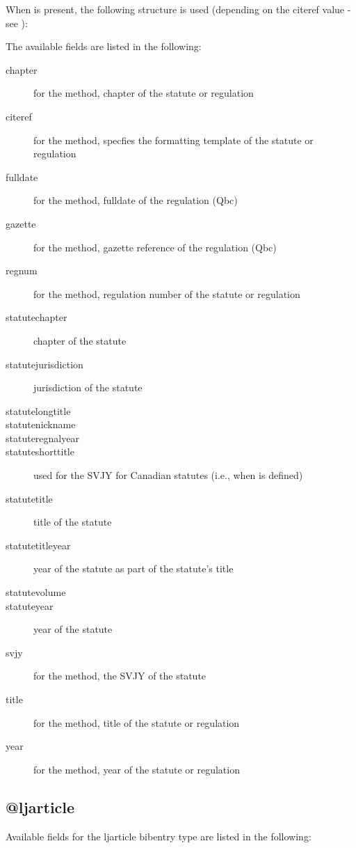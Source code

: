 \p When  is present, the following structure is used (depending on the citeref value - see ):

\begin{myquotation}
\end{myquotation}

\p The available fields are listed in the following:

\begin{description}
\item[chapter]for the  method, chapter of the statute or regulation
\item[citeref]for the  method, specfies the formatting template of the statute or regulation
\item[fulldate]for the  method, fulldate of the regulation (Qbc)
\item[gazette]for the  method, gazette reference of the regulation (Qbc)
\item[regnum]for the  method, regulation number of the statute or regulation
\item[statutechapter]chapter of the statute
\item[statutejurisdiction]jurisdiction of the statute
\item[statutelongtitle]
\item[statutenickname]
\item[statuteregnalyear]
\item[statuteshorttitle]used for the SVJY for Canadian statutes (i.e., when  is defined)
\item[statutetitle]title of the statute
\item[statutetitleyear]year of the statute as part of the statute’s title
\item[statutevolume]
\item[statuteyear]year of the statute
\item[svjy]for the  method, the SVJY  of the statute
\item[title]for the  method, title of the statute or regulation
\item[year]for the  method, year of the statute or regulation
\end{description}



\subsection{@ljarticle}
\p Available fields for the ljarticle bibentry type are listed in the following:

